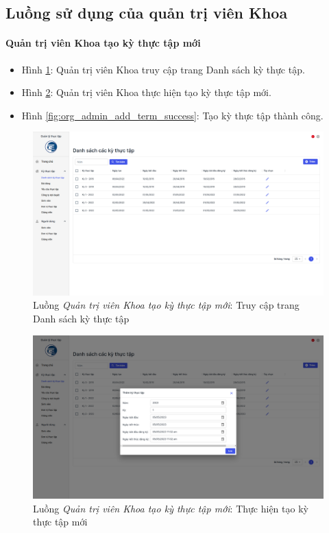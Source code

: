 \documentclass[./../main.tex]{subfiles}
\begin{document}
\subsection{Luồng sử dụng của quản trị viên Khoa}

\paragraph*{Quản trị viên Khoa tạo kỳ thực tập mới}

\begin{itemize}
	\item Hình \ref{fig:org_admin_access_list_terms}: Quản trị viên Khoa truy cập trang Danh sách kỳ thực tập. 
	\item Hình \ref{fig:org_admin_add_term}: Quản trị viên Khoa thực hiện tạo kỳ thực tập mới.
	\item Hình \ref{fig:org_admin_add_term_success}: Tạo kỳ thực tập thành công.
\end{itemize}

\begin{figure}[]
	\includegraphics[width=\linewidth]{./images/image53.png}
	\caption{Luồng \emph{Quản trị viên Khoa tạo kỳ thực tập mới}: Truy cập trang Danh sách kỳ thực tập}
	\label{fig:org_admin_access_list_terms}
\end{figure}

\begin{figure}[]
	\includegraphics[width=\linewidth]{./images/image54.png}
	\caption{Luồng \emph{Quản trị viên Khoa tạo kỳ thực tập mới}: Thực hiện tạo kỳ thực tập mới}
	\label{fig:org_admin_add_term}
\end{figure}
\end{document}
